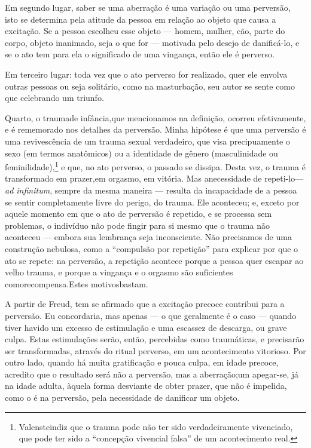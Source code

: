 Em segundo lugar, saber se uma aberração é uma variação\idxvariadefi{} ou uma
perversão, isto se determina pela atitude da pessoa em relação ao
objeto que causa a excitação. Se a pessoa escolheu esse objeto --- homem,
mulher, cão, parte do corpo, objeto inanimado, seja o que for ---
motivada pelo desejo de danificá-lo, e se o ato tem para ela o
significado de uma vingança,\idxvinga{} então ele é perverso.

Em terceiro lugar: toda vez que o ato perverso for realizado, quer
ele envolva outras pessoas ou seja solitário, como na masturbação, seu
autor se sente como que celebrando um triunfo.

Quarto, o trauma\idxtrauma[|(] de infância,\idxinfan[|(] que mencionamos na definição, ocorreu
efetivamente, e é rememorado nos detalhes da perversão. Minha hipótese
é que uma perversão é uma revivescência de um trauma sexual verdadeiro,
que visa precipuamente o sexo (em termos anatômicos) ou a identidade de
gênero (masculinidade ou feminilidade),\footnote{ Valenstein\idxvalen[|nn] diz que o
trauma pode não ter sido verdadeiramente vivenciado, que pode ter sido
a ``concepção vivencial falsa'' de um
acontecimento real.} e que, no ato perverso, o passado se dissipa.
Desta vez, o trauma é transformado em prazer,\idxfantapraz[|(] em orgasmo, em vitória.
Mas a\idxtraumanece[|(] necessidade de repeti-lo\idxpervrepet[|(] --- \textit{ad infinitum}, sempre da mesma
maneira --- resulta da incapacidade de a pessoa se sentir
completamente livre do perigo, do trauma. Ele aconteceu; e, exceto por
aquele momento em que o ato de perversão é repetido, e se processa sem
problemas, o indivíduo não pode fingir para si mesmo que o trauma não
aconteceu --- embora sua lembrança seja inconsciente. Não precisamos de
uma construção nebulosa, como a ``compulsão por
repetição'' para explicar por que o ato se repete: na
perversão, a repetição acontece porque a pessoa quer escapar ao velho
trauma, e porque a vingança\idxvinga{} e o orgasmo são suficientes como\idxtrauma[|)]
recompensa.\idxpervrepet[|)] Estes motivos\idxtraumanece[|)] bastam.

A partir de Freud, tem se afirmado que a\idxsexueinf{} excitação precoce\idxinfanexcit{}
 contribui para a perversão. Eu concordaria, mas apenas --- o que
geralmente é o caso --- quando tiver havido um excesso de estimulação e
uma escassez de descarga, ou grave culpa. Estas estimulações serão,
então, percebidas como traumáticas, e precisarão ser transformadas,
através do ritual perverso, em um acontecimento vitorioso. Por outro
lado, quando há muita gratificação e pouca culpa, em idade precoce,
acredito que o resultado será não a perversão, mas a aberração;\idxinfan[|)] um
apegar-se, já na idade adulta, àquela forma desviante de obter prazer,
que não é impelida, como o é na perversão, pela necessidade de
danificar um objeto.

